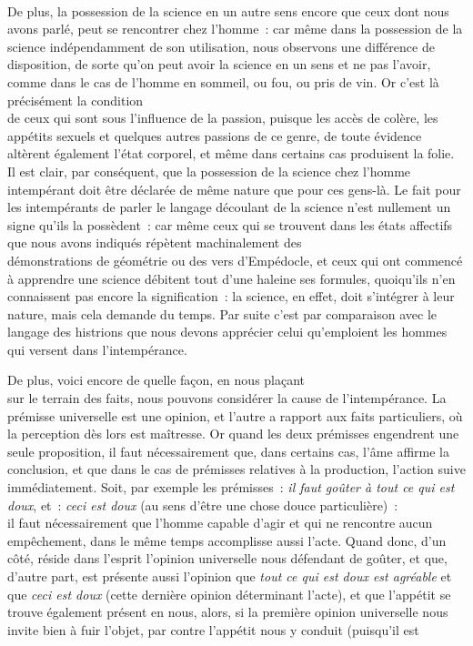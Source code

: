 \documentclass[french,twoside]{book} %
\begin{document}
\\
De plus, la possession de la science en un autre sens encore que ceux dont nous avons parlé, peut se rencontrer chez l’homme : car même dans la possession de la science indépendamment de son utilisation, nous observons une différence de disposition, de sorte qu’on peut avoir la science en un sens et ne pas l’avoir, comme dans le cas de l’homme en sommeil, ou fou, ou pris de vin. Or c’est là précisément la condition \\
de ceux qui sont sous l’influence de la passion, puisque les accès de colère, les appétits sexuels et quelques autres passions de ce genre, de toute évidence altèrent également l’état corporel, et même dans certains cas produisent la folie. Il est clair, par conséquent, que la possession de la science chez l’homme intempérant doit être déclarée de même nature que pour ces gens-là. Le fait pour les intempérants de parler le langage découlant de la science n’est nullement un signe qu’ils la possèdent : car même ceux qui se trouvent dans les états affectifs que nous avons indiqués répètent machinalement des \\
démonstrations de géométrie ou des vers d’Empédocle, et ceux qui ont commencé à apprendre une science débitent tout d’une haleine ses formules, quoiqu’ils n’en connaissent pas encore la signification : la science, en effet, doit s’intégrer à leur nature, mais cela demande du temps. Par suite c’est par comparaison avec le langage des histrions que nous devons apprécier celui qu’emploient les hommes qui versent dans l’intempérance.\par
De plus, voici encore de quelle façon, en nous plaçant \\
sur le terrain des faits, nous pouvons considérer la cause de l’intempérance. La prémisse universelle est une opinion, et l’autre a rapport aux faits particuliers, où la perception dès lors est maîtresse. Or quand les deux prémisses engendrent une seule proposition, il faut nécessairement que, dans certains cas, l’âme affirme la conclusion, et que dans le cas de prémisses relatives à la production, l’action suive immédiatement. Soit, par exemple les prémisses : {\itshape il faut goûter à tout ce qui est doux}, et : {\itshape ceci est doux} (au sens d’être une chose douce particulière) : \\
il faut nécessairement que l’homme capable d’agir et qui ne rencontre aucun empêchement, dans le même temps accomplisse aussi l’acte. Quand donc, d’un côté, réside dans l’esprit l’opinion universelle nous défendant de goûter, et que, d’autre part, est présente aussi l’opinion que {\itshape tout ce qui est doux est agréable} et que {\itshape ceci est doux} (cette dernière opinion déterminant l’acte), et que l’appétit se trouve également présent en nous, alors, si la première opinion universelle nous invite bien à fuir l’objet, par contre l’appétit nous y conduit (puisqu’il est \\
\end{document}
